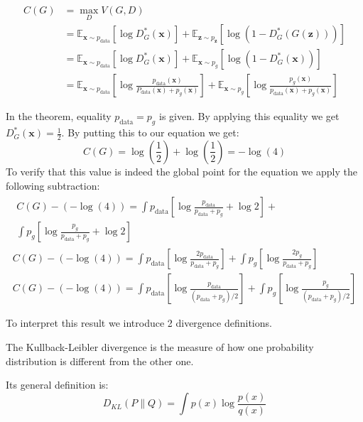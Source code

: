 \begin{align}
    C(G) &= \max _{D} V(G, D) \\[5pt]
    & =\mathbb{E}_{\boldsymbol{x} \sim p_{\mathrm{data}}}\left[\log D_{G}^{*}(\boldsymbol{x})\right]+\mathbb{E}_{\boldsymbol{z} \sim p_{\boldsymbol{z}}}\left[\log \left(1-D_{G}^{*}(G(\boldsymbol{z}))\right)\right] \\[5pt]
    & =\mathbb{E}_{\boldsymbol{x} \sim p_{\mathrm{data}}}\left[\log D_{G}^{*}(\boldsymbol{x})\right]+\mathbb{E}_{\boldsymbol{x} \sim p_{g}}\left[\log \left(1-D_{G}^{*}(\boldsymbol{x})\right)\right] \\[5pt]
    & =\mathbb{E}_{\boldsymbol{x} \sim p_{\mathrm{data}}}\left[\log \frac{p_{\mathrm{data}}(\boldsymbol{x})}{P_{\mathrm{data}}(\boldsymbol{x})+p_{g}(\boldsymbol{x})}\right]+\mathbb{E}_{\boldsymbol{x} \sim p_{g}}\left[\log \frac{p_{g}(\boldsymbol{x})}{p_{\mathrm{data}}(\boldsymbol{x})+p_{g}(\boldsymbol{x})}\right] 
\end{align}

In the theorem, equality $ p_{\text{data}} = p_g$ is given. By applying this equality we get
$D^{*}_G(\boldsymbol{x}) = \frac{1}{2}$. By putting this to our equation we get:
 $$C(G) = \log(\frac{1}{2}) + \log(\frac{1}{2}) = - \log(4)$$
To verify that this value is indeed the global
point for the equation we apply the following subtraction: 
\begin{multline}
    \label{eqn:gan_optim_proof}
    \begin{split}
        C(G)-(-\log (4))  =\int p_{\text {data}}\left[\log \frac{p_{\text {data}}}{p_{\text {data}}+p_{g}}+\log 2\right]+\\ \int p_{g}\left[\log \frac{p_{g}}{p_{\text {data}}+p_{g}}+\log 2\right]
    \end{split}\\[5pt]
    C(G)-(-\log (4)) =\int p_{\text {data}}\left[\log \frac{2 p_{\text {data}}}{p_{\text {data}}+p_{g}}\right]+\int p_{g}\left[\log \frac{2 p_{g}}{p_{\text {data}}+p_{g}}\right]\\[5pt]
    C(G)-(-\log (4)) =\int p_{\text {data}}\left[\log \frac{p_{\text {data}}}{\left(p_{\text {data}}+p_{g}\right) / 2}\right]+\int p_{g}\left[\log \frac{p_{g}}{\left(p_{\text {data}}+p_{g}\right) / 2}\right]
\end{multline}

To interpret this result we introduce 2 divergence definitions.
\begin{definition}
    The Kullback-Leibler divergence is the measure of how one probability distribution is different from
    the other one.   
\end{definition}
Its general definition is:
\begin{equation}
    D_{K L}(P \| Q)=\int p(x) \log \frac{p(x)}{q(x)}
\end{equation}

